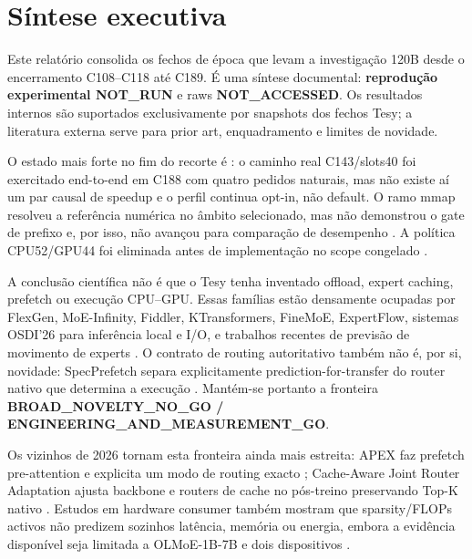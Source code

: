 \section{Síntese executiva}
Este relatório consolida os fechos de época que levam a investigação 120B desde o encerramento C108--C118 até C189. É uma síntese documental: \textbf{reprodução experimental NOT\_RUN} e raws \textbf{NOT\_ACCESSED}. Os resultados internos são suportados exclusivamente por snapshots dos fechos Tesy; a literatura externa serve para prior art, enquadramento e limites de novidade.

O estado mais forte no fim do recorte é : o caminho real C143/slots40 foi exercitado end-to-end em C188 com quatro pedidos naturais, mas não existe aí um par causal de speedup e o perfil continua opt-in, não default.  O ramo mmap resolveu a referência numérica no âmbito selecionado, mas não demonstrou o gate de prefixo e, por isso, não avançou para comparação de desempenho . A política CPU52/GPU44 foi eliminada antes de implementação no scope congelado .

A conclusão científica não é que o Tesy tenha inventado offload, expert caching, prefetch ou execução CPU--GPU. Essas famílias estão densamente ocupadas por FlexGen, MoE-Infinity, Fiddler, KTransformers, FineMoE, ExpertFlow, sistemas OSDI'26 para inferência local e I/O, e trabalhos recentes de previsão de movimento de experts \cite{sheng2023flexgen,xue2024moeinfinity,kamahori2025fiddler,chen2025ktransformers,yu2026finemoe,he2026expertflow,wang2026localslo,jiang2026kairox,chen2026copilotio,yu2026patterns}. O contrato de routing autoritativo também não é, por si, novidade: SpecPrefetch separa explicitamente prediction-for-transfer do router nativo que determina a execução \cite{kong2026specprefetch}. Mantém-se portanto a fronteira \textbf{BROAD\_NOVELTY\_NO\_GO / ENGINEERING\_AND\_MEASUREMENT\_GO}.

Os vizinhos de 2026 tornam esta fronteira ainda mais estreita: APEX faz prefetch pre-attention e explicita um modo de routing exacto \cite{kanani2026apex}; Cache-Aware Joint Router Adaptation ajusta backbone e routers de cache no pós-treino preservando Top-K nativo \cite{wu2026cacheaware}. Estudos em hardware consumer também mostram que sparsity/FLOPs activos não predizem sozinhos latência, memória ou energia, embora a evidência disponível seja limitada a OLMoE-1B-7B e dois dispositivos \cite{alfarizy2026consumer}.
